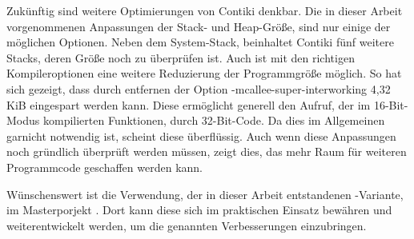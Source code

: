 Zukünftig sind weitere Optimierungen von Contiki denkbar. Die in dieser Arbeit vorgenommenen Anpassungen der Stack- und Heap-Größe,
sind nur einige der möglichen Optionen. Neben dem System-Stack, beinhaltet Contiki fünf weitere Stacks, deren Größe noch zu überprüfen ist.
Auch ist mit den richtigen Kompileroptionen eine weitere Reduzierung der Programmgröße möglich. So hat sich gezeigt, dass durch
entfernen der Option -mcallee-super-interworking 4,32 KiB eingespart werden kann. Diese ermöglicht generell den Aufruf, der im 16-Bit-Modus
kompilierten Funktionen, durch 32-Bit-Code. Da dies im Allgemeinen garnicht notwendig ist, scheint diese überflüssig.
Auch wenn diese Anpassungen noch gründlich überprüft werden müssen, zeigt dies, das mehr Raum für weiteren Programmcode geschaffen werden kann.

Wünschenswert ist die Verwendung, der in dieser Arbeit entstandenen -Variante, im Masterporjekt .
Dort kann diese sich im praktischen Einsatz bewähren und weiterentwickelt werden, um die genannten Verbesserungen
einzubringen.